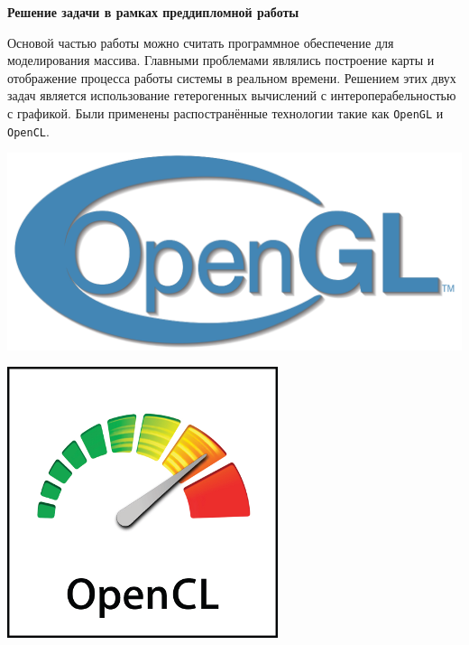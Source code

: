 \begin{slide}

    \makeatletter
    \let\@topfil\relax
    \makeatother

    \textbf{Решение задачи в рамках преддипломной работы}

    Основой частью работы можно считать программное обеспечение для моделирования
    массива. Главными проблемами являлись построение карты и отображение процесса работы системы
    в реальном времени. Решением этих двух задач является использование гетерогенных 
    вычислений с интероперабельностью с графикой. Были применены распостранённые 
    технологии такие как \verb|OpenGL| и \verb|OpenCL|.

    \begin{flushleft}
        \includegraphics[width=0.4\linewidth]{opengl.png}
    \end{flushleft}

    \hfill

    \vspace{-9em}
    \begin{flushright}
    \includegraphics[width=0.3\linewidth]{opencl.png}
    \end{flushright}

\end{slide}

